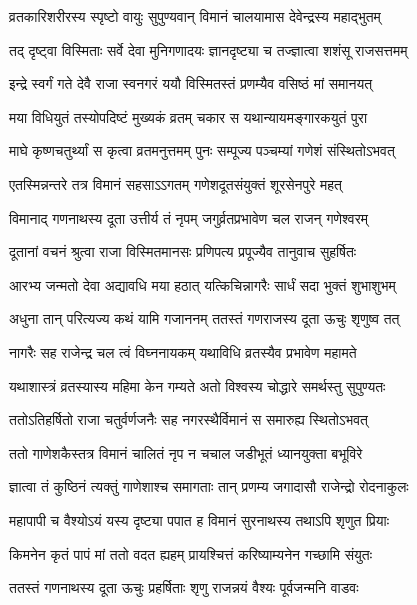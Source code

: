 \twolineshloka
{व्रतकारिशरीरस्य स्पृष्टो वायुः सुपुण्यवान्}
{विमानं चालयामास देवेन्द्रस्य महाद्भुतम्} %

\twolineshloka
{तद् दृष्ट्वा विस्मिताः सर्वे देवा मुनिगणादयः}
{ज्ञानदृष्ट्या च तज्ज्ञात्वा शशंसू राजसत्तमम्} %

\twolineshloka
{इन्द्रे स्वर्गं गते देवै राजा स्वनगरं ययौ}
{विस्मितस्तं प्रणम्यैव वसिष्ठं मां समानयत्} %

\twolineshloka
{मया विधियुतं तस्योपदिष्टं मुख्यकं व्रतम्}
{चकार स यथान्यायमङ्गारकयुतं पुरा} %

\twolineshloka
{माघे कृष्णचतुर्थ्यां स कृत्वा व्रतमनुत्तमम्}
{पुनः सम्पूज्य पञ्चम्यां गणेशं संस्थितोऽभवत्} %

\twolineshloka
{एतस्मिन्नन्तरे तत्र विमानं सहसाऽऽगतम्}
{गणेशदूतसंयुक्तं शूरसेनपुरे महत्} %

\twolineshloka
{विमानाद् गणनाथस्य दूता उत्तीर्य तं नृपम्}
{जगुर्व्रतप्रभावेण चल राजन् गणेश्वरम्} %

\twolineshloka
{दूतानां वचनं श्रुत्वा राजा विस्मितमानसः}
{प्रणिपत्य प्रपूज्यैव तानुवाच सुहर्षितः} %


\twolineshloka
{आरभ्य जन्मतो देवा अद्यावधि मया हठात्}
{यत्किचिन्नागरैः सार्धं सदा भुक्तं शुभाशुभम्} %

\twolineshloka
{अधुना तान् परित्यज्य कथं यामि गजाननम्}
{ततस्तं गणराजस्य दूता ऊचुः श‍ृणुष्व तत्} %


\twolineshloka
{नागरैः सह राजेन्द्र चल त्वं विघ्ननायकम्}
{यथाविधि व्रतस्यैव प्रभावेण महामते} %

\twolineshloka
{यथाशास्त्रं व्रतस्यास्य महिमा केन गम्यते}
{अतो विश्वस्य चोद्धारे समर्थस्तु सुपुण्यतः} %

\twolineshloka
{ततोऽतिहर्षितो राजा चतुर्वर्णजनैः सह}
{नगरस्थैर्विमानं स समारुह्य स्थितोऽभवत्} %

\twolineshloka
{ततो गाणेशकैस्तत्र विमानं चालितं नृप}
{न चचाल जडीभूतं ध्यानयुक्ता बभूविरे} %

\twolineshloka
{ज्ञात्वा तं कुष्ठिनं त्यक्तुं गाणेशाश्च समागताः}
{तान् प्रणम्य जगादासौ राजेन्द्रो रोदनाकुलः} %

\twolineshloka
{महापापी च वैश्योऽयं यस्य दृष्ट्या पपात ह}
{विमानं सुरनाथस्य तथाऽपि श‍ृणुत प्रियाः} %

\twolineshloka
{किमनेन कृतं पापं मां ततो वदत ह्यहम्}
{प्रायश्चित्तं करिष्याम्यनेन गच्छामि संयुतः} %

\twolineshloka
{ततस्तं गणनाथस्य दूता ऊचुः प्रहर्षिताः}
{श‍ृणु राजन्नयं वैश्यः पूर्वजन्मनि वाडवः} %

